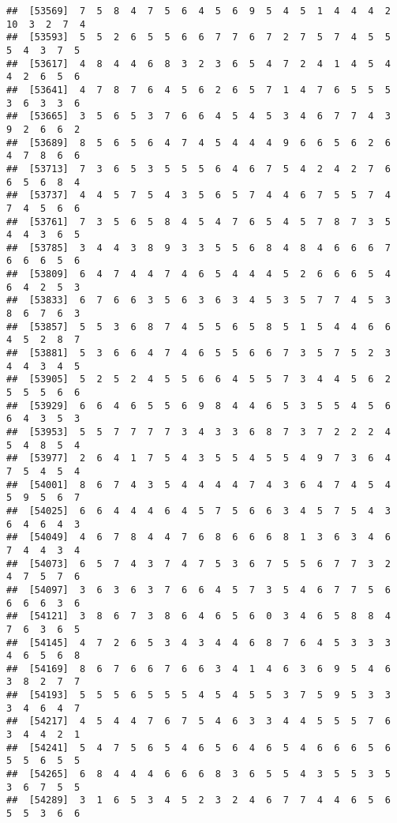 \documentclass[
]{book}
\begin{document}
\begin{verbatim}
##  [53569]  7  5  8  4  7  5  6  4  5  6  9  5  4  5  1  4  4  4  2 10  3  2  7  4
##  [53593]  5  5  2  6  5  5  6  6  7  7  6  7  2  7  5  7  4  5  5  5  4  3  7  5
##  [53617]  4  8  4  4  6  8  3  2  3  6  5  4  7  2  4  1  4  5  4  4  2  6  5  6
##  [53641]  4  7  8  7  6  4  5  6  2  6  5  7  1  4  7  6  5  5  5  3  6  3  3  6
##  [53665]  3  5  6  5  3  7  6  6  4  5  4  5  3  4  6  7  7  4  3  9  2  6  6  2
##  [53689]  8  5  6  5  6  4  7  4  5  4  4  4  9  6  6  5  6  2  6  4  7  8  6  6
##  [53713]  7  3  6  5  3  5  5  5  6  4  6  7  5  4  2  4  2  7  6  6  5  6  8  4
##  [53737]  4  4  5  7  5  4  3  5  6  5  7  4  4  6  7  5  5  7  4  7  4  5  6  6
##  [53761]  7  3  5  6  5  8  4  5  4  7  6  5  4  5  7  8  7  3  5  4  4  3  6  5
##  [53785]  3  4  4  3  8  9  3  3  5  5  6  8  4  8  4  6  6  6  7  6  6  6  5  6
##  [53809]  6  4  7  4  4  7  4  6  5  4  4  4  5  2  6  6  6  5  4  6  4  2  5  3
##  [53833]  6  7  6  6  3  5  6  3  6  3  4  5  3  5  7  7  4  5  3  8  6  7  6  3
##  [53857]  5  5  3  6  8  7  4  5  5  6  5  8  5  1  5  4  4  6  6  4  5  2  8  7
##  [53881]  5  3  6  6  4  7  4  6  5  5  6  6  7  3  5  7  5  2  3  4  4  3  4  5
##  [53905]  5  2  5  2  4  5  5  6  6  4  5  5  7  3  4  4  5  6  2  5  5  5  6  6
##  [53929]  6  6  4  6  5  5  6  9  8  4  4  6  5  3  5  5  4  5  6  6  4  3  5  3
##  [53953]  5  5  7  7  7  7  3  4  3  3  6  8  7  3  7  2  2  2  4  5  4  8  5  4
##  [53977]  2  6  4  1  7  5  4  3  5  5  4  5  5  4  9  7  3  6  4  7  5  4  5  4
##  [54001]  8  6  7  4  3  5  4  4  4  4  7  4  3  6  4  7  4  5  4  5  9  5  6  7
##  [54025]  6  6  4  4  4  6  4  5  7  5  6  6  3  4  5  7  5  4  3  6  4  6  4  3
##  [54049]  4  6  7  8  4  4  7  6  8  6  6  6  8  1  3  6  3  4  6  7  4  4  3  4
##  [54073]  6  5  7  4  3  7  4  7  5  3  6  7  5  5  6  7  7  3  2  4  7  5  7  6
##  [54097]  3  6  3  6  3  7  6  6  4  5  7  3  5  4  6  7  7  5  6  6  6  6  3  6
##  [54121]  3  8  6  7  3  8  6  4  6  5  6  0  3  4  6  5  8  8  4  7  6  3  6  5
##  [54145]  4  7  2  6  5  3  4  3  4  4  6  8  7  6  4  5  3  3  3  4  6  5  6  8
##  [54169]  8  6  7  6  6  7  6  6  3  4  1  4  6  3  6  9  5  4  6  3  8  2  7  7
##  [54193]  5  5  5  6  5  5  5  4  5  4  5  5  3  7  5  9  5  3  3  3  4  6  4  7
##  [54217]  4  5  4  4  7  6  7  5  4  6  3  3  4  4  5  5  5  7  6  3  4  4  2  1
##  [54241]  5  4  7  5  6  5  4  6  5  6  4  6  5  4  6  6  6  5  6  5  5  6  5  5
##  [54265]  6  8  4  4  4  6  6  6  8  3  6  5  5  4  3  5  5  3  5  3  6  7  5  5
##  [54289]  3  1  6  5  3  4  5  2  3  2  4  6  7  7  4  4  6  5  6  5  5  3  6  6

\end{verbatim}
\end{document}
